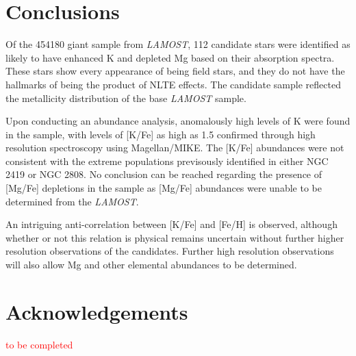 \documentclass[a4paper,fleqn,usenatbib]{mnras}
\newcommand{\todo}[1]{\textcolor{red}{#1}}
\newcommand{\project}[1]{\emph{#1}}
\newcommand{\lamost}{\project{LAMOST}}
\begin{document}
\section{Conclusions}
\label{sec:conclusion}
Of the 454180 giant sample from \lamost, 112 candidate stars were identified as likely to have enhanced K and depleted Mg based on their absorption spectra. These stars show every appearance of being field stars, and they do not have the hallmarks of being the product of NLTE effects. The candidate sample reflected the metallicity distribution of the base \textit{LAMOST} sample.

Upon conducting an abundance analysis, anomalously high levels of K were found in the sample, with levels of [K/Fe] as high as 1.5 confirmed through high resolution spectroscopy using Magellan/MIKE. The [K/Fe] abundances were not consistent with the extreme populations previsously identified in either NGC 2419 or NGC 2808. No conclusion can be reached regarding the presence of [Mg/Fe] depletions in the sample as [Mg/Fe] abundances were unable to be determined from the \lamost.

An intriguing anti-correlation between [K/Fe] and [Fe/H] is observed, although whether or not this relation is physical remains uncertain without further higher resolution observations of the candidates. Further high resolution observations will also allow Mg and other elemental abundances to be determined.

\section*{Acknowledgements}
\todo{to be completed}

\bsp	%
\label{lastpage}
\end{document}
